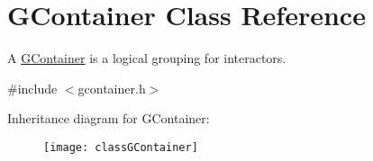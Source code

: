 \hypertarget{classGContainer}{}\section{G\+Container Class Reference}
\label{classGContainer}


A \mbox{\hyperlink{classGContainer}{G\+Container}} is a logical grouping for interactors.  




{\ttfamily \#include $<$gcontainer.\+h$>$}

Inheritance diagram for G\+Container\+:\begin{figure}[H]
\begin{center}
\leavevmode
\texttt{[image: classGContainer]}
\end{center}
\end{figure}
